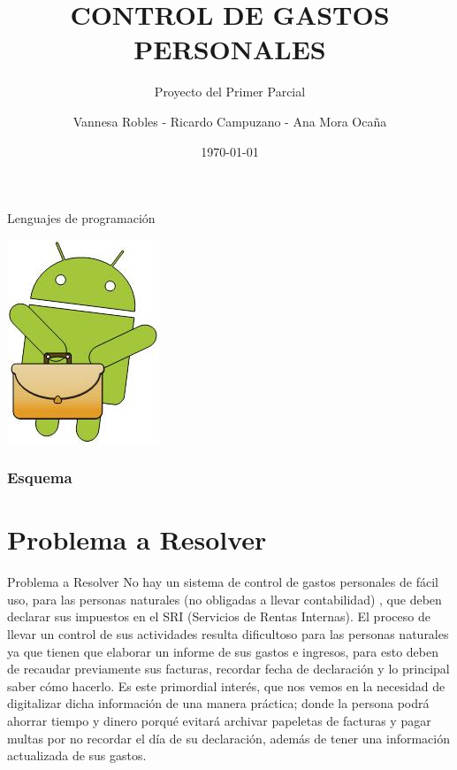 \documentclass[utf8]{beamer}
\title{CONTROL DE GASTOS PERSONALES}
\subtitle {Proyecto del Primer Parcial}
\author{Vannesa Robles -  Ricardo Campuzano -  Ana Mora Ocaña}
\date{\today}
\institute {ESPOL}
\begin{document}
\begin{frame}[plain]{Lenguajes de programación}
\begin{center}
\includegraphics [width = 0.2 \textwidth]{logo.jpg} %
\end{center}
\titlepage
\end{frame}

\begin{frame}
\frametitle{Esquema} %
\tableofcontents[pausesections]
\end{frame}

\section{Problema a Resolver}
\begin{frame}[allowframebreaks]
\begin{block}{Problema a Resolver }
No hay un sistema de control de gastos personales de fácil uso, para las personas naturales (no obligadas a llevar contabilidad) , que deben declarar sus  impuestos en el SRI (Servicios de Rentas Internas). 
El proceso de llevar un control de sus actividades resulta dificultoso para las personas naturales ya que tienen que elaborar un informe de sus gastos e ingresos, para esto deben de recaudar previamente sus facturas, recordar fecha de declaración  y lo principal saber cómo hacerlo. 
Es este primordial interés, que nos vemos en la necesidad de digitalizar dicha información de una manera práctica; donde la persona podrá ahorrar tiempo y dinero porqué evitará archivar  papeletas de facturas y pagar multas por no recordar el día de su declaración,  además de tener una información actualizada de sus gastos.
\end {block}
\end{frame}
\end{document}
